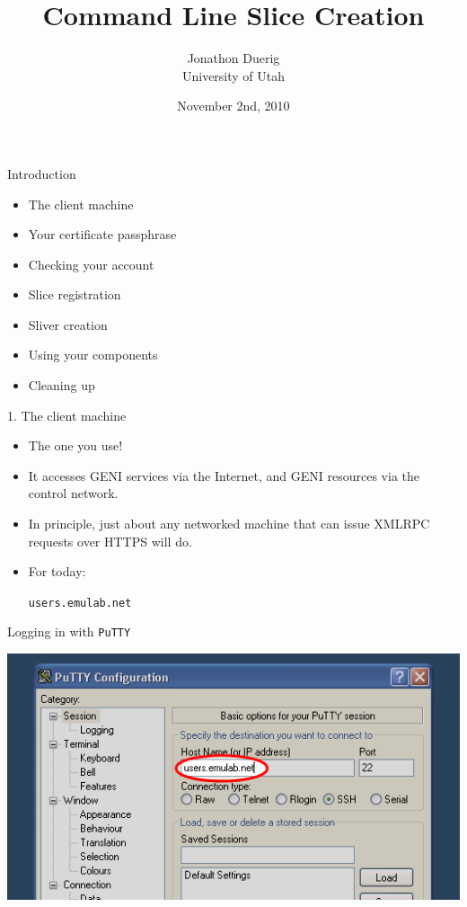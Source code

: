\documentclass[landscape]{slides}
\title{Command Line Slice Creation}
\author{Jonathon Duerig\\ University of Utah}
\date{November 2nd, 2010}
\newcommand{\heading}[1]{{\fontseries{b}\selectfont\begin{center}{\LARGE\color{red} #1}\end{center}}}
\newcommand{\code}[1]{\begin{center}{\tt #1}\end{center}}
\begin{document}
\selectfont
\maketitle

\begin{slide}
\heading{Introduction}
\begin{small}
\begin{itemize}
\item The client machine
\item Your certificate passphrase
\item Checking your account
\item Slice registration
\item Sliver creation
\item Using your components
\item Cleaning up
\end{itemize}
\end{small}
\end{slide}

\begin{slide}
\heading{1. The client machine}
\begin{itemize}
\item The one you use!
\item It accesses GENI services via the Internet, and GENI resources via the
  control network.
\item In principle, just about any networked machine that can issue
  XMLRPC requests over HTTPS will do.
\item For today:
\code{users.emulab.net}
\end{itemize}
\end{slide}

\begin{slide}
\heading{Logging in with {\tt PuTTY}}
\begin{center}
\includegraphics[width=17cm]{putty-1}
\end{center}
\end{slide}
\end{document}
